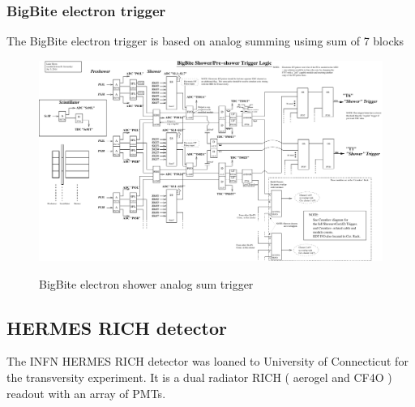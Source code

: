 \documentclass{article}
\begin{document}
\subsubsection{BigBite electron trigger}
The BigBite electron trigger is based on analog summing usimg sum of 7 blocks
\newpage
\begin{figure}
\includegraphics[scale=0.9,angle=270]{figs/Sh-PS_logic_v2A.pdf}\\
\caption {BigBite electron shower analog sum trigger \label{BBEtrig}}
\end{figure}
\newpage
\subsection{HERMES RICH detector}
The INFN HERMES RICH detector was loaned to University of Connecticut for
the transversity experiment. It is a dual radiator RICH ( aerogel and CF4O )
readout with an array of PMTs. 
\end{document}
